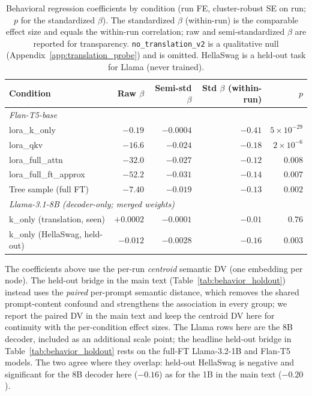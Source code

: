 \documentclass{article}
\theoremstyle{definition}
\theoremstyle{plain}
\begin{document}
\begin{table}[h]
\caption{Behavioral regression coefficients by condition (run FE, cluster-robust SE on run; $p$ for
  the standardized $\beta$). The standardized $\beta$ (within-run) is the comparable effect size and
  equals the within-run correlation; raw and semi-standardized $\beta$ are reported for transparency.
  \texttt{no\_translation\_v2} is a qualitative null (Appendix~\ref{app:translation_probe}) and is
  omitted. HellaSwag is a held-out task for Llama (never trained).}
\label{tab:regression_betas}
\begin{center}
\begin{tabular}{lrrrr}
\toprule
Condition & Raw $\beta$ & Semi-std $\beta$ & Std $\beta$ (within-run) & $p$ \\
\midrule
\multicolumn{5}{l}{\textit{Flan-T5-base}} \\
lora\_k\_only          & $-0.19$  & $-0.0004$ & $-0.41$ & $5\!\times\!10^{-29}$ \\
lora\_qkv              & $-16.6$  & $-0.024$  & $-0.18$ & $2\!\times\!10^{-6}$ \\
lora\_full\_attn       & $-32.0$  & $-0.027$  & $-0.12$ & $0.008$ \\
lora\_full\_ft\_approx & $-52.2$  & $-0.031$  & $-0.14$ & $0.007$ \\
Tree sample (full FT)  & $-7.40$  & $-0.019$  & $-0.13$ & $0.002$ \\
\midrule
\multicolumn{5}{l}{\textit{Llama-3.1-8B (decoder-only; merged weights)}} \\
k\_only (translation, seen)   & $+0.0002$ & $-0.0001$ & $-0.01$ & $0.76$ \\
k\_only (HellaSwag, held-out) & $-0.012$  & $-0.0028$ & $-0.16$ & $0.003$ \\
\bottomrule
\end{tabular}
\end{center}
\end{table}

The coefficients above use the per-run \emph{centroid} semantic DV (one embedding per node). The
held-out bridge in the main text (Table~\ref{tab:behavior_holdout}) instead uses the \emph{paired}
per-prompt semantic distance, which removes the shared prompt-content confound and strengthens the
association in every group; we report the paired DV in the main text and keep the centroid DV here for
continuity with the per-condition effect sizes. The Llama rows here are the 8B decoder, included as an
additional scale point; the headline held-out bridge in Table~\ref{tab:behavior_holdout} rests on the
full-FT Llama-3.2-1B and Flan-T5 models. The two agree where they overlap: held-out HellaSwag is
negative and significant for the 8B decoder here ($-0.16$) as for the 1B in the main text ($-0.20$).
\end{document}
